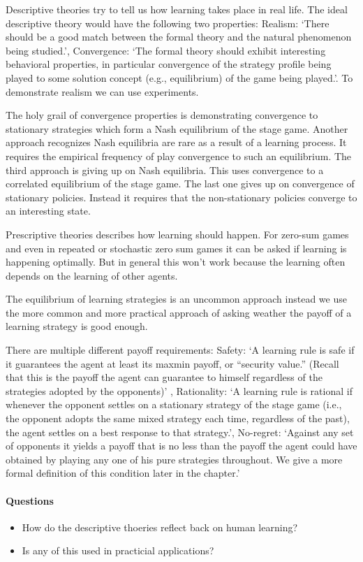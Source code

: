 \documentclass{article}
\begin{document}
Descriptive theories try to tell us how learning takes place
in real life.
The ideal descriptive theory would have the following two properties:
Realism: `There should be a good match between the formal theory and the
natural phenomenon being studied.', Convergence: `The formal
theory should exhibit interesting behavioral properties, in particular
convergence of the strategy profile being played to some solution concept
(e.g., equilibrium) of the game being played.'.
To demonstrate realism we can use experiments.

The holy grail of convergence properties is demonstrating convergence to
stationary strategies which form a Nash equilibrium of the stage game.
Another approach recognizes Nash equilibria are rare as a result
of a learning process. It requires the empirical frequency of
play convergence to such an equilibrium.
The third approach is giving up on Nash equilibria. This uses
convergence to a correlated equilibrium of the stage game.
The last one gives up on convergence of stationary policies. Instead it
requires that the non-stationary policies converge to an interesting state.

Prescriptive theories describes how learning should happen.
For zero-sum games and even in repeated or stochastic
zero sum games it can be asked if learning is happening optimally.
But in general this won't work because the learning often depends on the
learning of other agents.

The equilibrium of learning strategies is an uncommon approach
instead we use the more common and more practical approach
of asking weather the payoff of a learning strategy is good enough.

There are multiple different payoff requirements:
Safety: `A learning rule is safe if it guarantees the agent at least
its maxmin payoff, or “security value.” (Recall that this is the payoff the agent
can guarantee to himself regardless of the strategies adopted by the opponents)'
, Rationality: `A learning rule is rational if whenever the opponent
settles on a stationary strategy of the stage game (i.e., the opponent adopts the
same mixed strategy each time, regardless of the past), the agent settles on a best
response to that strategy.', No-regret: `Against any set of opponents it yields a payoff that is no less than the
payoff the agent could have obtained by playing any one of his pure strategies
throughout. We give a more formal definition of this condition later in the chapter.'

\paragraph{Questions}
\begin{itemize}
	\item How do the descriptive thoeries reflect back on human learning?
	\item Is any of this used in practicial applications?
\end{itemize}
\end{document}
